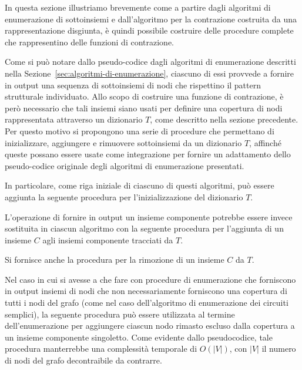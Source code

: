 In questa sezione illustriamo brevemente come a partire dagli algoritmi di enumerazione di sottoinsiemi
e dall'algoritmo per la contrazione costruita da una rappresentazione
disgiunta, \`e quindi possibile costruire delle procedure complete che rappresentino delle funzioni di contrazione.

\label{subsec:procedure-per-la-gestione-deli-dizionari}

Come si pu\`o notare dallo pseudo-codice dagli algoritmi di enumerazione descritti nella
Sezione~\ref{sec:algoritmi-di-enumerazione}, ciascuno di essi provvede a fornire in output una sequenza di
sottoinsiemi di nodi che rispettino il pattern strutturale individuato.
Allo scopo di costruire una funzione di contrazione, \`e però necessario che tali insiemi siano usati per definire
una copertura di nodi rappresentata attraverso un dizionario $T$, come descritto nella sezione precedente.
Per questo motivo si propongono una serie di procedure che permettano di inizializzare, aggiungere e rimuovere
sottoinsiemi da un dizionario $T$, affinché queste possano essere usate come integrazione per fornire un
adattamento dello pseudo-codice originale degli algoritmi di enumerazione presentati.
\newpage

In particolare, come riga iniziale di ciascuno di questi algoritmi, può essere aggiunta la seguente procedura per
l'inizializzazione del dizionario $T$.



L'operazione di fornire in output un insieme componente potrebbe essere invece sostituita in ciascun algoritmo
con la seguente procedura per l'aggiunta di un insieme $C$ agli insiemi componente tracciati da $T$. \newline



Si fornisce anche la procedura per la rimozione di un insieme $C$ da $T$.



Nel caso in cui si avesse a che fare con procedure di enumerazione che forniscono in output insiemi di nodi che non
necessariamente forniscono una copertura di tutti i nodi del grafo (come nel caso dell'algoritmo di enumerazione
dei circuiti semplici), la seguente procedura può essere utilizzata al termine dell'enumerazione per aggiungere
ciascun nodo rimasto escluso dalla copertura a un insieme componente singoletto. Come evidente dallo
pseudocodice, tale procedura manterrebbe una complessit\`a temporale di $O(|V|)$, con $|V|$ il numero di nodi del grafo
decontraibile da contrarre.

